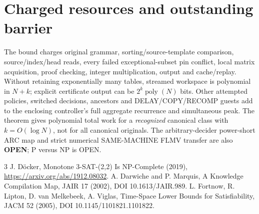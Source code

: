 \documentclass[11pt]{article}
\begin{document}
\section{Charged resources and outstanding barrier}
The bound charges original grammar, sorting/source-template comparison, source/index/head reads, every failed exceptional-subset pin conflict, local matrix acquisition, proof checking, integer multiplication, output and cache/replay. Without retaining exponentially many tables, streamed workspace is polynomial in $N+k$; explicit certificate output can be $2^k\operatorname{poly}(N)$ bits. Other attempted policies, switched decisions, ancestors and DELAY/COPY/RECOMP guests add to the enclosing controller's full aggregate recurrence and simultaneous peak. The theorem gives polynomial total work for a \emph{recognized} canonical class with $k=O(\log N)$, not for all canonical originals. The arbitrary-decider power-short ARC map and strict numerical SAME-MACHINE FLMV transfer are also \textbf{OPEN}; P versus NP is OPEN.
\begin{thebibliography}{3}
 J. D\"ocker, Monotone 3-SAT-(2,2) Is NP-Complete (2019), \url{https://arxiv.org/abs/1912.08032}.
 A. Darwiche and P. Marquis, A Knowledge Compilation Map, JAIR 17 (2002), DOI 10.1613/JAIR.989.
 L. Fortnow, R. Lipton, D. van Melkebeek, A. Viglas, Time-Space Lower Bounds for Satisfiability, JACM 52 (2005), DOI 10.1145/1101821.1101822.
\end{thebibliography}
\end{document}
